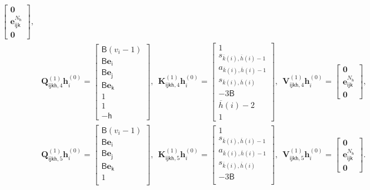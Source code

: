 \documentclass[10pt]{article}
\renewcommand{\bar}{\overline}
\newcommand{\<}{\left\langle}
\renewcommand{\>}{\right\rangle}
\renewcommand{\bQ}{\mathbf{Q}}
\newcommand{\bzero}{{\mathbf 0}}
\newcommand{\state}{{s}}
\newcommand{\action}{{a}}
\newcommand{\tfthres}{{\mathsf{B}}}   %
\newcommand{\Numvi}{{N}}
\newcommand{\oddeven}{{v}}
\def\bK{{\mathbf K}}
\def\bQ{{\mathbf Q}}
\def\bV{{\mathbf V}}
\def\be{{\mathbf e}}
\def\bh{{\mathbf h}}
\def\si{{\mathsf{i}}}
\def\sj{{\mathsf{j}}}
\def\sk{{\mathsf{k}}}
\def\sh{{\mathsf{h}}}
\begin{document}
\begin{align*}
\begin{bmatrix}
\bzero\\\be^{\Numvi_\sh}_{\si\sj\sk}
\\\bzero\end{bmatrix},\\
&\bQ^{(1)}_{\si\sj\sk\sh,4}\bh^{(0)}_{i}=
\begin{bmatrix}
\tfthres(\oddeven_i-1)\\
        \tfthres\be_\si\\
         \tfthres\be_\sj\\
          \tfthres\be_\sk\\
          1\\
          1\\
         -\sh
    \end{bmatrix},~~ \bK^{(1)}_{\si\sj\sk\sh,4}\bh^{(0)}_{i}=\begin{bmatrix}1\\
     \state_{\bar{k}(i),\bar{h}(i)-1}\\
        \action_{\bar{k}(i),\bar{h}(i)-1}\\
         \state_{\bar{k}(i),\bar{h}(i)}\\
        -3\tfthres\\
      \bar{h}(i)-2\\
        1
\end{bmatrix},~~ \bV^{(1)}_{\si\sj\sk\sh,4}\bh^{(0)}_{i}=
\begin{bmatrix}
\bzero\\\be^{\Numvi_\sh}_{\si\sj\sk}
\\\bzero\end{bmatrix},\\
&\bQ^{(1)}_{\si\sj\sk\sh,5}\bh^{(0)}_{i}=
\begin{bmatrix}
\tfthres(\oddeven_i-1)\\
        \tfthres\be_\si\\
         \tfthres\be_\sj\\
          \tfthres\be_\sk\\
          1\\
    \end{bmatrix},~~ \bK^{(1)}_{\si\sj\sk\sh,5}\bh^{(0)}_{i}=\begin{bmatrix}1\\
     \state_{\bar{k}(i),\bar{h}(i)-1}\\
        \action_{\bar{k}(i),\bar{h}(i)-1}\\
         \state_{\bar{k}(i),\bar{h}(i)}\\
        -3\tfthres\\
\end{bmatrix},~~ \bV^{(1)}_{\si\sj\sk\sh,5}\bh^{(0)}_{i}=
\begin{bmatrix}
\bzero\\\be^{\Numvi_\sh}_{\si\sj\sk}
\\\bzero\end{bmatrix}.\\
\end{align*}
\end{document}
